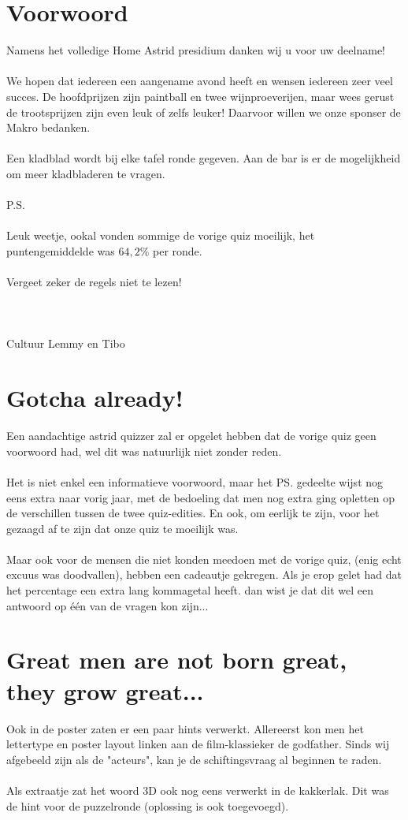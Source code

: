 \documentclass{exam}
\begin{document}
\section*{Voorwoord}
Namens het volledige Home Astrid presidium danken wij u voor uw deelname!\\ \\
We hopen dat iedereen een aangename avond heeft en wensen iedereen zeer veel succes. De hoofdprijzen zijn paintball en twee wijnproeverijen, maar wees gerust de trootsprijzen zijn even leuk of zelfs leuker! Daarvoor willen we onze sponser de Makro bedanken.\\ \\
Een kladblad wordt bij elke tafel ronde gegeven. Aan de bar is er de mogelijkheid om meer kladbladeren te vragen.\\ \\
P.S.\\ \\
Leuk weetje, ookal vonden sommige de vorige quiz moeilijk, het puntengemiddelde was $64,2\%$ per ronde.\\ \\
Vergeet zeker de regels niet te lezen!\\ \\ \\ \\
Cultuur Lemmy en Tibo
\newpage
\section*{Gotcha already!}
Een aandachtige astrid quizzer zal er opgelet hebben dat de vorige quiz geen voorwoord had, wel dit was natuurlijk niet zonder reden.\\ \\Het is niet enkel een informatieve voorwoord, maar het PS. gedeelte wijst nog eens extra naar vorig jaar, met de bedoeling dat men nog extra ging opletten op de verschillen tussen de twee quiz-edities. En ook, om eerlijk te zijn, voor het gezaagd af te zijn dat onze quiz te moeilijk was.\\ \\
Maar ook voor de mensen die niet konden meedoen met de vorige quiz, (enig echt excuus was doodvallen), hebben een cadeautje gekregen. Als je erop gelet had dat het percentage een extra lang kommagetal heeft. dan wist je dat dit wel een antwoord op één van de vragen kon zijn...
\section*{Great men are not born great, they grow great...}
Ook in de poster zaten er een paar hints verwerkt. Allereerst kon men het lettertype en poster layout linken aan de film-klassieker de godfather. Sinds wij afgebeeld zijn als de "acteurs", kan je de schiftingsvraag al beginnen te raden.\\ \\ Als extraatje zat het woord 3D ook nog eens verwerkt in de kakkerlak. Dit was de hint voor de puzzelronde (oplossing is ook toegevoegd).
\end{document}
